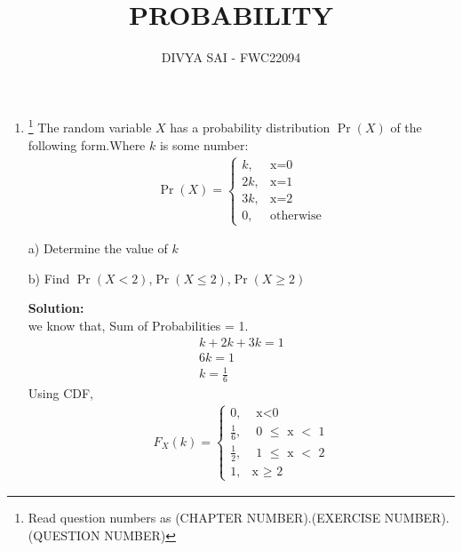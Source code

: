 \documentclass{article}
\providecommand{\pr}[1]{\ensuremath{\Pr\left(#1\right)}}
\newcommand{\solution}{\noindent \textbf{Solution: }}
\begin{document}
\title{PROBABILITY}
\author{\Large DIVYA SAI - FWC22094}
\date{}

\maketitle
\begin{enumerate}
[label=16.\arabic{enumi}.\arabic{enumii}]%
\setcounter{enumi}{3}
\setcounter{enumii}{10}

\item \footnote{Read question numbers as (CHAPTER NUMBER).(EXERCISE NUMBER).(QUESTION NUMBER)} {The random variable $X$ has a probability distribution \pr{X} of the following form.Where $k$ is some number: }
\begin{align}
  \pr{X} =
    \begin{cases}
      k,  & \text{x=0}\\
      2k, & \text{x=1}\\
      3k, & \text{x=2}\\
      0 , & \text{otherwise}
    \end{cases}       
\end{align}

a) Determine the value of $k$ 

b) Find \pr{X < 2},\pr{X \leq 2},\pr{X \geq 2}  


\solution\\
we know that,
Sum of Probabilities = 1.
\begin{align}
&k + 2k + 3k  = 1 &\\
&6k = 1 &\\
&k = \frac{1}{6}&
\end{align}
Using CDF,
\begin{align}
  F_X(k) =
    \begin{cases}
      0,  & \text{ x$<$0}\\
      \frac{1}{6}, & \text{ 0 $\leq$ x $<$ 1}\\
      \frac{1}{2}, & \text{ 1 $\leq$ x $<$ 2}\\
      1 , & \text{x $\geq$ 2}
    \end{cases}       
\end{align}


\end{enumerate}
\end{document}
